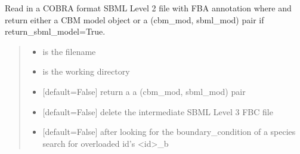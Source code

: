 \documentclass[letterpaper,12pt,english]{sphinxmanual}
\begin{document}
\begin{fulllineitems}
\label{\detokenize{api/io:cbmpy.CBXML.sbml_readCOBRASBML}}
\pysigstartsignatures
\pysiglinewithargsret
{}
{\sphinxparamcomma {}\sphinxparamcomma {}\sphinxparamcomma {}\sphinxparamcomma {}\sphinxparamcomma {}\sphinxparamcomma {}\sphinxparamcomma {}}
{}
\pysigstopsignatures
\sphinxAtStartPar
Read in a COBRA format SBML Level 2 file with FBA annotation where and return either a CBM model object or a (cbm\_mod, sbml\_mod) pair if return\_sbml\_model=True.
\begin{quote}\begin{description}
\begin{itemize}
\item {} 
\sphinxAtStartPar
{} \textendash{} is the filename

\item {} 
\sphinxAtStartPar
{} \textendash{} is the working directory

\item {} 
\sphinxAtStartPar
{} \textendash{} {[}default=False{]} return a a (cbm\_mod, sbml\_mod) pair

\item {} 
\sphinxAtStartPar
{} \textendash{} {[}default=False{]} delete the intermediate SBML Level 3 FBC file

\item {} 
\sphinxAtStartPar
{} \textendash{} {[}default=False{]} after looking for the boundary\_condition of a species search for overloaded id’s \textless{}id\textgreater{}\_b


\end{itemize}
\end{description}
\end{quote}
\end{fulllineitems}
\end{document}
